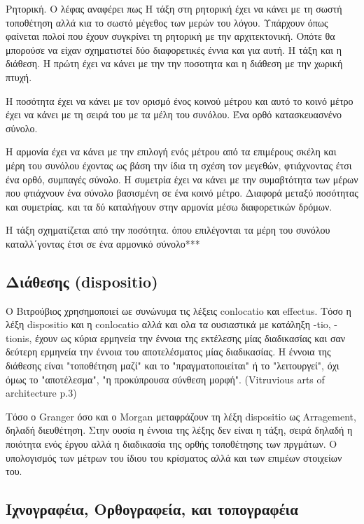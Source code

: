Ρητορική. Ο λέφας αναφέρει πως Η τάξη στη ρητορική έχει να κάνει με τη σωστή τοποθέτηση αλλά κια το σωστό μέγεθος των μερών του λόγου. Υπάρχουν όπως φαίνεται πολοί που έχουν συγκρίνει τη ρητορική με την αρχιτεκτονική. Οπότε θα μπορούσε να είχαν σχηματιστεί δύο διαφορετικές έννια και για αυτή. Η τάξη και η διάθεση. Η πρώτη έχει να κάνει με την την ποσοτητα και η διάθεση με την χωρική πτυχή.

Η ποσότητα έχει να κάνει με τον ορισμό ένος κοινού μέτρου και αυτό το κοινό μέτρο έχει να κάνει με τη σειρά του με τα μέλη του συνόλου. Ένα ορθό κατασκευασνένο σύνολο.

Η αρμονία έχει να κάνει με την επιλογή ενός μέτρου από τα επιμέρους σκέλη και μέρη του συνόλου έχοντας ως βάση την ίδια τη σχέση τον μεγεθών, φτιάχνοντας έτσι ένα ορθό, συμπαγές σύνολο. Η συμετρία έχει να κάνει με την συμαβτότητα των μέρων που φτιάχνουν ένα σύνολο βασισμένη σε ένα κοινό μέτρο. Διαφορά μεταξύ ποσότητας και συμετρίας. και τα δύ καταλήγουν στην αρμονία μέσω διαφορετικών δρόμων.

Η τάξη σχηματίζεται από την ποσότητα. όπου επιλέγονται τα μέρη του συνόλου καταλλ΄γοντας έτσι σε ένα αρμονικό σύνολο***
  
\subsection{Διάθεσης (dispositio)}
  
  Ο Βιτρούβιος χρησημοποιεί ωε συνώνυμα τις λέξεις conlocatio και effectus. 
  Τόσο η λέξη dispositio και η conlocatio αλλά και ολα τα ουσιαστικά με 
  κατάληξη -tio, -tionis, έχουν ως κύρια ερμηνεία την έννοια της εκτέλεσης μίας 
  διαδικασίας και σαν δεύτερη ερμηνεία την έννοια του αποτελέσματος μίας 
  διαδικασίας. Η έννοια της διάθεσης είναι "τοποθέτηση μαζί" και το 
  "πραγματοποιείται" ή το "λειτουργεί", όχι όμως το "αποτέλεσμα", "η 
  προκύπρουσα σύνθεση μορφή". (Vitruvious arts of architecture p.3)
  
  Τόσο ο Granger όσο και ο Morgan μεταφράζουν τη λέξη dispositio ως Arragement, δηλαδή διευθέτηση. Στην ουσία η έννοια της λέξης δεν είναι η τάξη, σειρά δηλαδή η ποιότητα ενός έργου αλλά η διαδικασία της ορθής τοποθέτησης των πργμάτων. Ο υπολογισμός των μέτρων του ίδιου του κρίσματος αλλά και των επιμέων στοιχείων του.
  
\subsection{Ιχνογραφέια, Ορθογραφεία, και τοπογραφέια}
  
